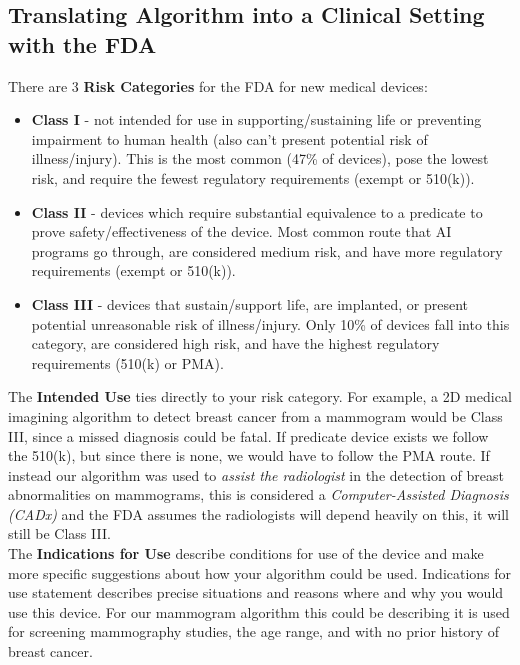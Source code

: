 \documentclass[11pt, a4paper]{article}
\begin{document}
	\subsection{Translating Algorithm into a Clinical Setting with the FDA}
	There are 3 \textbf{Risk Categories} for the FDA for new medical devices:
	\begin{itemize}
		\item \textbf{Class I} - not intended for use in supporting/sustaining life or preventing impairment to human health (also can't present potential risk of illness/injury). This is the most common (47\% of devices), pose the lowest risk, and require the fewest regulatory requirements (exempt or 510(k)). 
		\item \textbf{Class II} - devices which require substantial equivalence to a predicate to prove safety/effectiveness of the device. Most common route that AI programs go through, are considered medium risk, and have more regulatory requirements (exempt or 510(k)).
		\item \textbf{Class III} - devices that sustain/support life, are implanted, or present potential unreasonable risk of illness/injury. Only 10\% of devices fall into this category, are considered high risk, and have the highest regulatory requirements (510(k) or PMA).
	\end{itemize}
	The \textbf{Intended Use} ties directly to your risk category. For example, a 2D medical imagining algorithm to detect breast cancer from a mammogram would be Class III, since a missed diagnosis could be fatal. If predicate device exists we follow the 510(k), but since there is none, we would have to follow the PMA route. If instead our algorithm was used to \textit{assist the radiologist} in the detection of breast abnormalities on mammograms, this is considered a \textit{Computer-Assisted Diagnosis (CADx)} and the FDA assumes the radiologists will depend heavily on this, it will still be Class III. \vspace*{3mm}\\
	The \textbf{Indications for Use} describe conditions for use of the device and make more specific suggestions about how your algorithm could be used. Indications for use statement describes precise situations and reasons where and why you would use this device. For our mammogram algorithm this could be describing it is used for screening mammography studies, the age range, and with no prior history of breast cancer. \newpage
	
\end{document}
